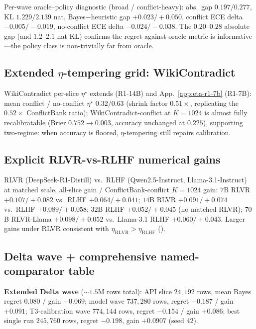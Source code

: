 Per-wave oracle--policy diagnostic (broad / conflict-heavy):
abs.\ gap $0.197 / 0.277$, KL $1.229 / 2.139$ nat, Bayes$-$heuristic
gap $+0.023 / +0.050$, conflict ECE delta $-0.005 / -0.019$,
no-conflict ECE delta $-0.024 / -0.038$.  The $0.20$--$0.28$
absolute gap (and $1.2$--$2.1$ nat KL) confirms the regret-against-oracle
metric is informative—the policy class is non-trivially far from
oracle.


\subsection{Extended $\eta$-tempering grid: WikiContradict}
\label{app:eta-wiki-extended}

WikiContradict per-slice $\eta^\star$ extends 
(R1-14B) and App.~\ref{app:eta-r1-7b} (R1-7B): mean conflict / no-conflict
$\eta^\star$ $0.32 / 0.63$ (shrink factor $0.51\!\times$, replicating
the $0.52\!\times$ ConflictBank ratio); WikiContradict-conflict at
$K\!=\!1024$ is almost fully recalibratable
(Brier $0.752\!\to\!0.003$, accuracy unchanged at $0.225$),
supporting two-regime: when accuracy is floored, $\eta$-tempering
still repairs calibration.


\subsection{Explicit RLVR-vs-RLHF numerical gains}
\label{app:rlvr-explicit}

RLVR (DeepSeek-R1-Distill) vs.\ RLHF (Qwen2.5-Instruct,
Llama-3.1-Instruct) at matched scale, all-slice gain / ConflictBank-conflict
$K\!=\!1024$ gain:
$7$B RLVR $+0.107 / +0.082$ vs.\ RLHF $+0.064 / +0.041$;
$14$B RLVR $+0.091 / +0.074$ vs.\ RLHF $+0.089 / +0.058$;
$32$B RLHF $+0.052 / +0.045$ (no matched RLVR);
$70$B RLVR-Llama $+0.098 / +0.052$ vs.\ Llama-3.1 RLHF $+0.060 / +0.043$.
Larger gains under RLVR consistent with
$\eta_{\mathrm{RLVR}}\!>\!\eta_{\mathrm{RLHF}}$
().


\subsection{Delta wave + comprehensive named-comparator table}
\label{app:delta-detail}\label{app:named-advantage}

\textbf{Extended Delta wave} ($\sim\!1.5$M rows total): API slice
$24{,}192$ rows, mean Bayes regret $0.080$ / gain $+0.069$; model
wave $737{,}280$ rows, regret $-0.187$ / gain $+0.091$;
T3-calibration wave $774{,}144$ rows, regret $-0.154$ / gain
$+0.086$; best single run $245{,}760$ rows, regret $-0.198$, gain
$+0.0907$ (seed 42).

